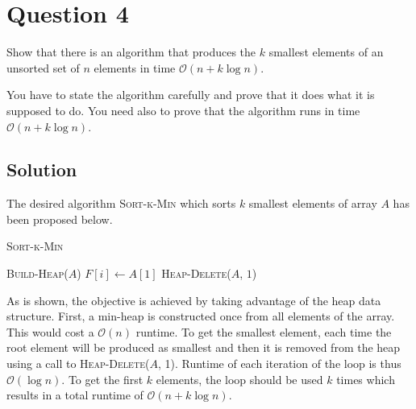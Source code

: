 
\section*{Question 4}
Show that there is an algorithm that produces the $k$ smallest elements of an unsorted set of $n$ elements in time $\mathcal{O}(n + k \log n)$.

You have to state the algorithm carefully and prove that it does what it is supposed to do. You need also to prove that the algorithm runs in time $\mathcal{O}(n + k \log n)$.

\subsection*{Solution}

The desired algorithm \textsc{Sort-k-Min} which sorts $k$ smallest elements of array $A$ has been proposed below.

\begin{algorithm}[H]
\caption{\textsc{Sort-k-Min}}
\begin{algorithmic}[1]
\State \textsc{Build-Heap}($A$)
\State $F[i] \leftarrow A[1]$
\State \textsc{Heap-Delete}($A$, $1$)
\EndFor
\end{algorithmic}
\end{algorithm}

As is shown, the objective is achieved by taking advantage of the heap data structure. First, a min-heap is constructed once from all elements of the array. This would cost a $\mathcal{O}(n)$ runtime. To get the smallest element, each time the root element will be produced as smallest and then it is removed from the heap using a call to \textsc{Heap-Delete}($A$, 1). Runtime of each iteration of the loop is thus $\mathcal{O}(\log n)$. To get the first $k$ elements, the loop should be used $k$ times which results in a total runtime of $\mathcal{O}(n + k\log n)$.
